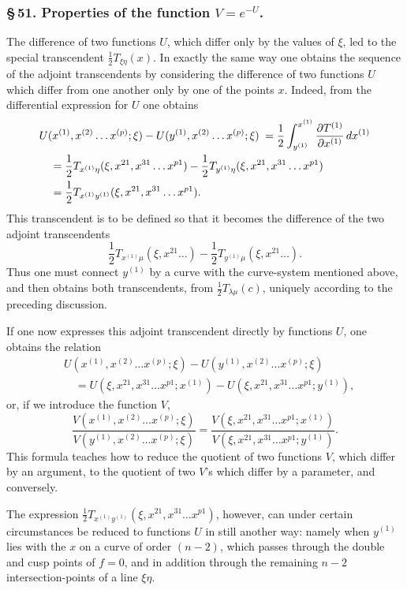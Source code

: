 \documentclass[10pt]{article}
\begin{document}
\subsubsection*{\S\,51. Properties of the function \(V=e^{-U}\).}

The difference of two functions \(U\), which differ only by the values of \(\xi\), led to the special transcendent \(\frac12T_{\xi\eta}(x)\). In exactly the same way one obtains the sequence of the adjoint transcendents by considering the difference of two functions \(U\) which differ from one another only by one of the points \(x\). Indeed, from the differential expression for \(U\) one obtains
\[
\begin{aligned}
&U(x^{(1)},x^{(2)}\ldots x^{(p)};\xi)-U(y^{(1)},x^{(2)}\ldots x^{(p)};\xi)\nobreak\hspace{0.25em}\nobreak=\frac12\int_{y^{(1)}}^{x^{(1)}}\frac{\partial T^{(1)}}{\partial x^{(1)}}\,dx^{(1)}\\
&\quad=\frac12T_{x^{(1)}\eta}(\xi,x^{21},x^{31}\ldots x^{p1})-\frac12T_{y^{(1)}\eta}(\xi,x^{21},x^{31}\ldots x^{p1})\\
&\quad=\frac12T_{x^{(1)}y^{(1)}}(\xi,x^{21},x^{31}\ldots x^{p1}).
\end{aligned}
\]
This transcendent is to be defined so that it becomes the difference of the two adjoint transcendents
\[
\frac12T_{x^{(1)}\mu}(\xi,x^{21}\ldots)-\frac12T_{y^{(1)}\mu}(\xi,x^{21}\ldots).
\]
Thus one must connect \(y^{(1)}\) by a curve with the curve-system mentioned above, and then obtains both transcendents, from \(\frac12T_{\lambda\mu}(c)\), uniquely according to the preceding discussion.

If one now expresses this adjoint transcendent directly by functions \(U\), one obtains the relation
\[
\tag{1}\begin{aligned}
&U(x^{(1)},x^{(2)}\ldots x^{(p)};\xi)-U(y^{(1)},x^{(2)}\ldots x^{(p)};\xi)\\
&\quad=U(\xi,x^{21},x^{31}\ldots x^{p1};x^{(1)})-U(\xi,x^{21},x^{31}\ldots x^{p1};y^{(1)}),
\end{aligned}
\]
or, if we introduce the function \(V\),
\[
\tag{2}\frac{V(x^{(1)},x^{(2)}\ldots x^{(p)};\xi)}{V(y^{(1)},x^{(2)}\ldots x^{(p)};\xi)}
=\frac{V(\xi,x^{21},x^{31}\ldots x^{p1};x^{(1)})}{V(\xi,x^{21},x^{31}\ldots x^{p1};y^{(1)})}.
\]
This formula teaches how to reduce the quotient of two functions \(V\), which differ by an argument, to the quotient of two \(V\)'s which differ by a parameter, and conversely.

The expression \(\frac12T_{x^{(1)}y^{(1)}}(\xi,x^{21},x^{31}\ldots x^{p1})\), however, can under certain circumstances be reduced to functions \(U\) in still another way: namely when \(y^{(1)}\) lies with the \(x\) on a curve of order \((n-2)\), which passes through the double and cusp points of \(f=0\), and in addition through the remaining \(n-2\) intersection-points of a line \(\xi\eta\).
\end{document}

